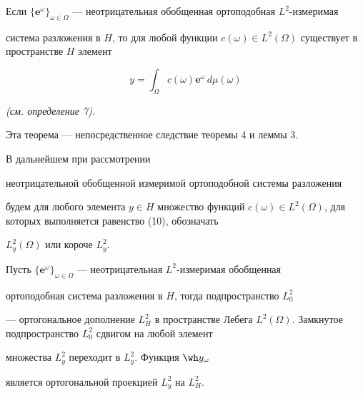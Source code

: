 \begin{thm}\hspace{-1.8mm}{\bf.}


Если $\{\boldsymbol e^\omega\}_{\omega\in


\Omega}$ --- неотрицательная обобщенная ортоподобная $L^2$-измеримая


система разложения в $H$, то для любой функции $c(\omega)\in L^2


(\Omega)$ существует в пространстве $H$ элемент


\begin{equation}


y=\int_\Omega c(\omega)\boldsymbol e^\omega\,d\mu(\omega)


\end{equation}


{\em (см. определение 7).}


\end{thm}





Эта теорема --- непосредственное следствие теоремы 4 и леммы 3.





В дальнейшем при рассмотрении


неотрицательной обобщенной измеримой ортоподобной системы разложения


будем для любого элемента $y\in H$ множество функций $c(\omega)\in


L^2(\Omega)$, для которых выполняется равенство (10), обозначать


$L^2_y(\Omega)$ или короче $L^2_y$.





\begin{thm}\hspace{-1.8mm}{\bf.}


Пусть $\{\boldsymbol e^\omega\}_{\omega\in


\Omega}$ --- неотрицательная $L^2$-измеримая обобщенная


ортоподобная система разложения в $H$, тогда подпространство $L^2_0$


--- ортогональное дополнение $L^2_H$ в пространстве Лебега $L^2


(\Omega)$. Замкнутое подпространство $L^2_0$ сдвигом на любой элемент


множества $L^2_y$ переходит в $L^2_y$. Функция $\wh y_\omega$


является ортогональной проекцией $L^2_y$ на $L^2_H$.


\end{thm}





